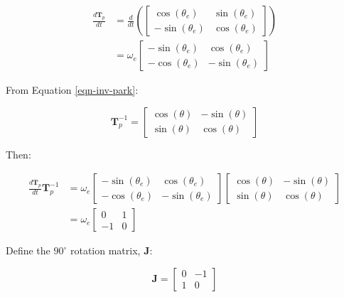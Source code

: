 \documentclass{article}
\begin{document}
\begin{align}
    \frac{d\mathbf{T}_p}{dt} &= \frac{d}{dt} \left(
    \begin{bmatrix}
        \cos(\theta_e) & \sin(\theta_e) \\
        -\sin(\theta_e) & \cos(\theta_e)
    \end{bmatrix}
    \right) \\[6pt]
    &= \omega_e
    \begin{bmatrix}
        -\sin(\theta_e) & \cos(\theta_e) \\
        -\cos(\theta_e) & -\sin(\theta_e)
    \end{bmatrix}
\end{align}

From Equation \ref{eqn-inv-park}:

\begin{equation}
    \mathbf{T}_p^{-1}
    =
    \begin{bmatrix}
        \cos(\theta) & -\sin(\theta) \\
        \sin(\theta) & \cos(\theta)
    \end{bmatrix}
\end{equation}

Then:

\begin{align}
    \frac{d\mathbf{T}_p}{dt}\mathbf{T}_p^{{-1}} &=
    \omega_e
    \begin{bmatrix}
        -\sin(\theta_e) & \cos(\theta_e) \\
        -\cos(\theta_e) & -\sin(\theta_e)
    \end{bmatrix}
        \begin{bmatrix}
        \cos(\theta) & -\sin(\theta) \\
        \sin(\theta) & \cos(\theta)
    \end{bmatrix} \\[6pt]
    &= \omega_e
    \begin{bmatrix}
        0 & 1 \\
        -1 & 0
    \end{bmatrix}
\end{align}

Define the $90^\circ$ rotation matrix, $\mathbf{J}$:

\begin{equation}
    \mathbf{J} =
    \begin{bmatrix}
        0 & -1 \\
        1 & 0
    \end{bmatrix}
\end{equation}
\end{document}
